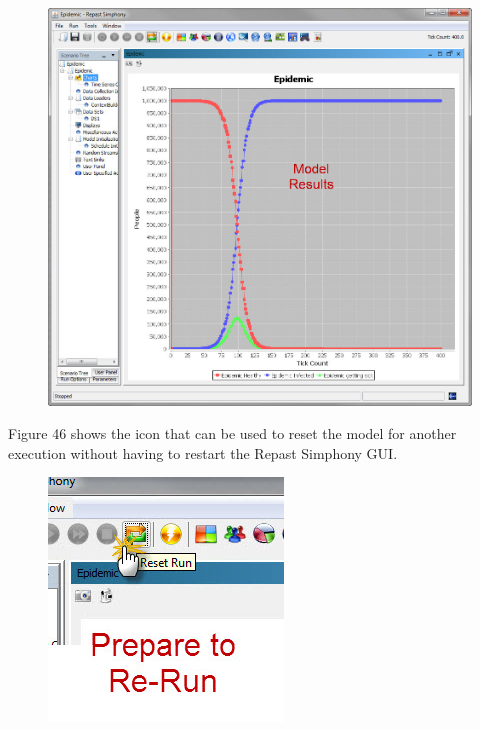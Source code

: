 \documentclass[11pt]{amsart}
\begin{document}
\begin{figure}[ht]
\begin{center}
\vspace{.2in}
\centerline {
\includegraphics[totalheight=0.5\textheight]{images/043.jpg}
}
\caption{}
\label{fig:043}
\end{center}
\end{figure}

Figure 46 shows the icon that can be used to reset the model for another execution without having to restart the Repast Simphony GUI.


\begin{figure}[ht]
\begin{center}
\vspace{.2in}
\centerline {
\includegraphics[totalheight=0.2\textheight]{images/044.jpg}
}
\caption{}
\label{fig:044}
\end{center}
\end{figure}
\end{document}
